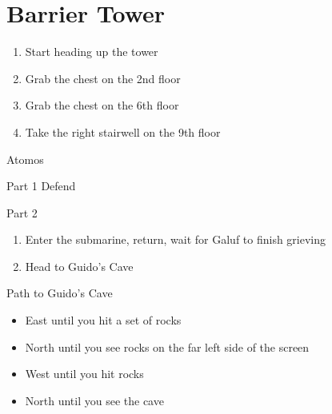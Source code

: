 \chapter{Barrier Tower}

\vspace{\baselineskip}

\begin{paracol}{2}

\begin{enumerate}
    \item Start heading up the tower
    \item Grab the  chest on the 2nd floor
    \item Grab the  chest on the 6th floor
    \item Take the right stairwell on the 9th floor
\end{enumerate}

\begin{boss}{Atomos}
	\varwb
	\begin{bossPart}{Part 1}
		 Defend
        \bartz \leftCommand{\drink} \then \heroDrink
        \bartz \leftCommand{\drink} \then \speedDrink
        \bartz \leftCommand{\drink} \then \heroDrink
        \bartz \leftCommand{\drink} \then \heroDrink
	\end{bossPart}
    \begin{bossPart}{Part 2}
        \bartz[\bossHl{(4x)}] \rightCommand{\gilToss}
        \item {}
        \vspace{1mm}
        \item[] 
	\end{bossPart}
	\varwe
\end{boss}

\begin{enumerate}[resume]
    \item Enter the submarine, return, wait for Galuf to finish grieving
    \item Head to Guido's Cave
\end{enumerate}

\begin{misc}{Path to Guido's Cave}
    \begin{itemize}
        \item East until you hit a set of rocks
        \item North until you see rocks on the far left side of the screen
        \item West until you hit rocks
        \item North until you see the cave
    \end{itemize}
\end{misc}


\end{paracol}
